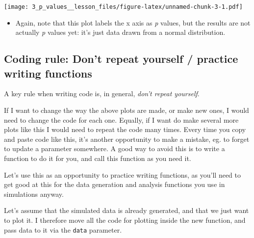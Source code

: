 \documentclass[
]{article}
\providecommand{\tightlist}{%
  \setlength{\itemsep}{0pt}\setlength{\parskip}{0pt}}
\begin{document}
\texttt{[image: 3\_p\_values\_\_lesson\_files/figure-latex/unnamed-chunk-3-1.pdf]}

\begin{itemize}
\tightlist
\item
  Again, note that this plot labels the x axis as \emph{p} values, but
  the results are not actually \emph{p} values yet: it's just data drawn
  from a normal distribution.
\end{itemize}

\hypertarget{coding-rule-dont-repeat-yourself-practice-writing-functions}{%
\subsection{Coding rule: Don't repeat yourself / practice writing
functions}\label{coding-rule-dont-repeat-yourself-practice-writing-functions}}

A key rule when writing code is, in general, \emph{don't repeat
yourself}.

If I want to change the way the above plots are made, or make new ones,
I would need to change the code for each one. Equally, if I want do make
several more plots like this I would need to repeat the code many times.
Every time you copy and paste code like this, it's another opportunity
to make a mistake, eg. to forget to update a parameter somewhere. A good
way to avoid this is to write a function to do it for you, and call this
function as you need it.

Let's use this as an opportunity to practice writing functions, as
you'll need to get good at this for the data generation and analysis
functions you use in simulations anyway.

Let's assume that the simulated data is already generated, and that we
just want to plot it. I therefore move all the code for plotting inside
the new function, and pass data to it via the \texttt{data} parameter.
\end{document}
